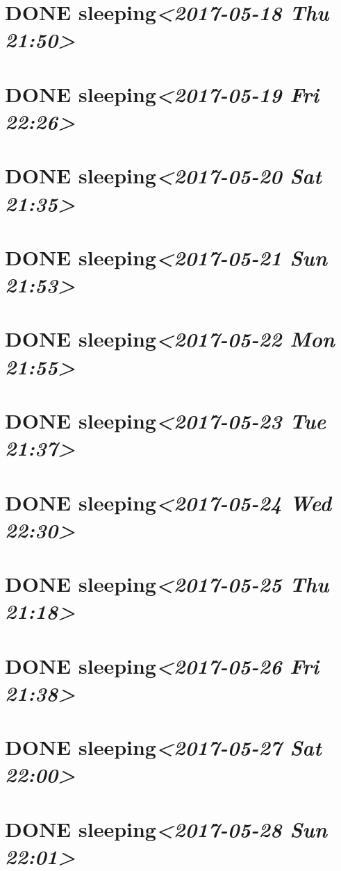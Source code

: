 \documentclass[cyan]{elegantnote}
\begin{document}
\section{{\bfseries\sffamily DONE} sleeping\textit{<2017-05-18 Thu 21:50>}}
\label{sec:org6d8796e}
\section{{\bfseries\sffamily DONE} sleeping\textit{<2017-05-19 Fri 22:26>}}
\label{sec:orge401e12}
\section{{\bfseries\sffamily DONE} sleeping\textit{<2017-05-20 Sat 21:35>}}
\label{sec:orgf2428cd}
\section{{\bfseries\sffamily DONE} sleeping\textit{<2017-05-21 Sun 21:53>}}
\label{sec:org9a38c3a}
\section{{\bfseries\sffamily DONE} sleeping\textit{<2017-05-22 Mon 21:55>}}
\label{sec:orgb79fc63}
\section{{\bfseries\sffamily DONE} sleeping\textit{<2017-05-23 Tue 21:37>}}
\label{sec:org1e4345b}
\section{{\bfseries\sffamily DONE} sleeping\textit{<2017-05-24 Wed 22:30>}}
\label{sec:org4f01271}
\section{{\bfseries\sffamily DONE} sleeping\textit{<2017-05-25 Thu 21:18>}}
\label{sec:orgba1974f}
\section{{\bfseries\sffamily DONE} sleeping\textit{<2017-05-26 Fri 21:38>}}
\label{sec:orga5e7cfa}
\section{{\bfseries\sffamily DONE} sleeping\textit{<2017-05-27 Sat 22:00>}}
\label{sec:org8ebbd06}
\section{{\bfseries\sffamily DONE} sleeping\textit{<2017-05-28 Sun 22:01>}}
\label{sec:orgf1218b6}
\end{document}
